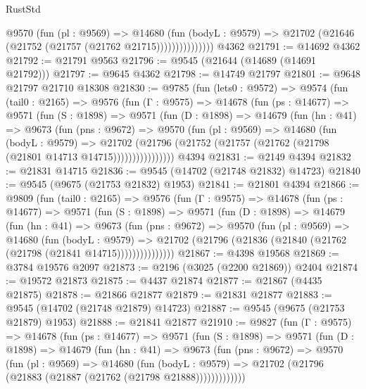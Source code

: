 \begin{lexlean}{RustStd}
\begin{coremodule}
                    @9570
                      (fun (pl : @9569) =>
                      @14680
                        (fun (bodyL : @9579) =>
                        @21702 (@21646 (@21752 (@21757 (@21762 @21715)))))))))))))))
    @4362
@21791 := @14692 @4362
@21792 := @21791 @9563
@21796 := @9545 (@21644 (@14689 (@14691 @21792)))
@21797 := @9645 @4362
@21798 := @14749 @21797
@21801 := @9648 @21797 @21710 @18308
@21830 := @9785
    (fun (lets0 : @9572) =>
    @9574
      (fun (tail0 : @2165) =>
      @9576
        (fun (Γ : @9575) =>
        @14678
          (fun (ps : @14677) =>
          @9571
            (fun (S : @1898) =>
            @9571
              (fun (D : @1898) =>
              @14679
                (fun (hn : @41) =>
                @9673
                  (fun (pns : @9672) =>
                  @9570
                    (fun (pl : @9569) =>
                    @14680
                      (fun (bodyL : @9579) =>
                      @21702
                        (@21796
                          (@21752 (@21757 (@21762 (@21798 (@21801 @14713 @14715))))))))))))))))
    @4394
@21831 := @2149 @4394
@21832 := @21831 @14715
@21836 := @9545 (@14702 (@21748 @21832) @14723)
@21840 := @9545 (@9675 (@21753 @21832) @1953)
@21841 := @21801 @4394
@21866 := @9809
    (fun (tail0 : @2165) =>
    @9576
      (fun (Γ : @9575) =>
      @14678
        (fun (ps : @14677) =>
        @9571
          (fun (S : @1898) =>
          @9571
            (fun (D : @1898) =>
            @14679
              (fun (hn : @41) =>
              @9673
                (fun (pns : @9672) =>
                @9570
                  (fun (pl : @9569) =>
                  @14680
                    (fun (bodyL : @9579) =>
                    @21702 (@21796 (@21836 (@21840 (@21762 (@21798 (@21841 @14715)))))))))))))))
@21867 := @4398 @19568
@21869 := @3784 @19576 @2097
@21873 := @2196 (@3025 (@2200 @21869)) @2404
@21874 := @19572 @21873
@21875 := @4437 @21874
@21877 := @21867 (@4435 @21875)
@21878 := @21866 @21877
@21879 := @21831 @21877
@21883 := @9545 (@14702 (@21748 @21879) @14723)
@21887 := @9545 (@9675 (@21753 @21879) @1953)
@21888 := @21841 @21877
@21910 := @9827
    (fun (Γ : @9575) =>
    @14678
      (fun (ps : @14677) =>
      @9571
        (fun (S : @1898) =>
        @9571
          (fun (D : @1898) =>
          @14679
            (fun (hn : @41) =>
            @9673
              (fun (pns : @9672) =>
              @9570
                (fun (pl : @9569) =>
                @14680
                  (fun (bodyL : @9579) =>
                  @21702 (@21796 (@21883 (@21887 (@21762 (@21798 @21888)))))))))))))

\end{coremodule}
\end{lexlean}
